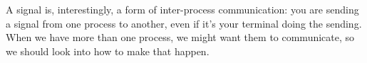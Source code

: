 A signal is, interestingly, a form of inter-process communication: you are sending a signal from one process to another, even if it's your terminal doing the sending. When we have more than one process, we might want them to communicate, so we should look into how to make that happen.





